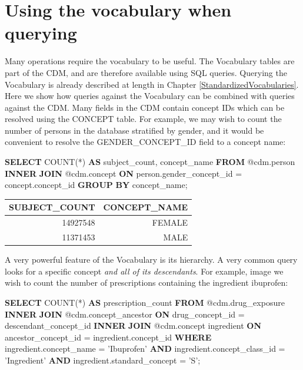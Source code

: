 \documentclass[]{book}
\newenvironment{Shaded}{\begin{snugshade}}{\end{snugshade}}
\newcommand{\KeywordTok}[1]{\textcolor[rgb]{0.13,0.29,0.53}{\textbf{#1}}}
\newcommand{\StringTok}[1]{\textcolor[rgb]{0.31,0.60,0.02}{#1}}
\newcommand{\FunctionTok}[1]{\textcolor[rgb]{0.00,0.00,0.00}{#1}}
\newcommand{\NormalTok}[1]{#1}
\begin{document}
\section{Using the vocabulary when
querying}\label{using-the-vocabulary-when-querying}

Many operations require the vocabulary to be useful. The Vocabulary
tables are part of the CDM, and are therefore available using SQL
queries. Querying the Vocabulary is already described at length in
Chapter \ref{StandardizedVocabularies}. Here we show how queries against
the Vocabulary can be combined with queries against the CDM. Many fields
in the CDM contain concept IDs which can be resolved using the CONCEPT
table. For example, we may wish to count the number of persons in the
database stratified by gender, and it would be convenient to resolve the
GENDER\_CONCEPT\_ID field to a concept name:

\begin{Shaded}
\begin{Highlighting}[]
\KeywordTok{SELECT} \FunctionTok{COUNT}\NormalTok{(*) }\KeywordTok{AS}\NormalTok{ subject_count,}
\NormalTok{  concept_name}
\KeywordTok{FROM}\NormalTok{ @cdm.person}
\KeywordTok{INNER} \KeywordTok{JOIN}\NormalTok{ @cdm.concept}
  \KeywordTok{ON}\NormalTok{ person.gender_concept_id = concept.concept_id}
\KeywordTok{GROUP} \KeywordTok{BY}\NormalTok{ concept_name;}
\end{Highlighting}
\end{Shaded}

\begin{longtable}[]{@{}rr@{}}
\toprule
SUBJECT\_COUNT & CONCEPT\_NAME\tabularnewline
\midrule
\endhead
14927548 & FEMALE\tabularnewline
11371453 & MALE\tabularnewline
\bottomrule
\end{longtable}

A very powerful feature of the Vocabulary is its hierarchy. A very
common query looks for a specific concept \emph{and all of its
descendants}. For example, image we wish to count the number of
prescriptions containing the ingredient ibuprofen:

\begin{Shaded}
\begin{Highlighting}[]
\KeywordTok{SELECT} \FunctionTok{COUNT}\NormalTok{(*) }\KeywordTok{AS}\NormalTok{ prescription_count}
\KeywordTok{FROM}\NormalTok{ @cdm.drug_exposure}
\KeywordTok{INNER} \KeywordTok{JOIN}\NormalTok{ @cdm.concept_ancestor}
  \KeywordTok{ON}\NormalTok{ drug_concept_id = descendant_concept_id}
\KeywordTok{INNER} \KeywordTok{JOIN}\NormalTok{ @cdm.concept ingredient}
  \KeywordTok{ON}\NormalTok{ ancestor_concept_id = ingredient.concept_id}
\KeywordTok{WHERE}\NormalTok{ ingredient.concept_name = }\StringTok{'Ibuprofen'}
  \KeywordTok{AND}\NormalTok{ ingredient.concept_class_id = }\StringTok{'Ingredient'}
  \KeywordTok{AND}\NormalTok{ ingredient.standard_concept = }\StringTok{'S'}\NormalTok{;}
\end{Highlighting}
\end{Shaded}
\end{document}
